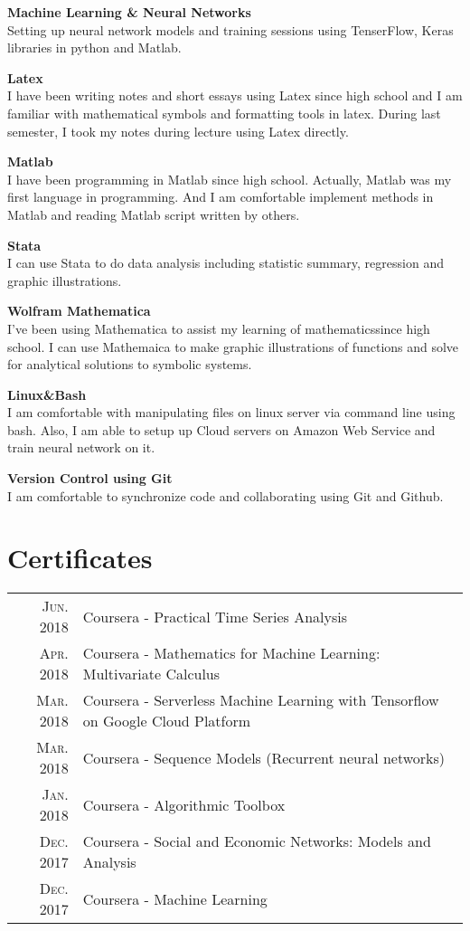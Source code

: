 \documentclass[a4paper,10pt]{article}
\begin{document}
    \textbf{Machine Learning & Neural Networks} \\
    Setting up neural network models and training sessions using TenserFlow, Keras libraries in python and Matlab.
    
    \textbf{Latex} \\
    I have been writing notes and short essays using Latex since high school and I am familiar with mathematical symbols and formatting tools in latex. During last semester, I took my notes during lecture using Latex directly.
    
    \textbf{Matlab} \\
    I have been programming in Matlab since high school. Actually, Matlab was my first language in programming. And I am comfortable implement methods in Matlab and reading Matlab script written by others.
    
    \textbf{Stata} \\
    I can use Stata to do data analysis including statistic summary, regression and graphic illustrations.
    
    \textbf{Wolfram Mathematica} \\
    I've been using Mathematica to assist my learning of mathematicssince high school. I can use Mathemaica to make graphic illustrations of functions and solve for analytical solutions to symbolic systems.
    
    \textbf{Linux\&Bash} \\
    I am comfortable with manipulating files on linux server via command line using bash.
    Also, I am able to setup up Cloud servers on Amazon Web Service and train neural network on it.
    
    \textbf{Version Control using Git} \\
    I am comfortable to synchronize code and collaborating using Git and Github.
    

\section{Certificates}
\begin{tabular}{rl}
    \textsc{Jun.} 2018 & Coursera - Practical Time Series Analysis \\
    \textsc{Apr.} 2018 & Coursera - Mathematics for Machine Learning: Multivariate Calculus \\
    \textsc{Mar.} 2018 & Coursera - Serverless Machine Learning with Tensorflow on Google Cloud Platform \\
    \textsc{Mar.} 2018 & Coursera - Sequence Models (Recurrent neural networks) \\
    \textsc{Jan.} 2018 & Coursera - Algorithmic Toolbox \\
    \textsc{Dec.} 2017 & Coursera - Social and Economic Networks: Models and Analysis \\
    \textsc{Dec.} 2017 & Coursera - Machine Learning \\
\end{tabular}
    
\end{document}
